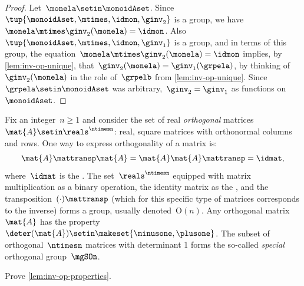 {\begin{proof}
    Let~$\monela \setin \monoidAset$.
    Since~$\tup{\monoidAset, \mtimes, \idmon, \ginv_2 }$ is a group, we have~$\monela \mtimes \ginv_2(\monela) = \idmon$.
    Also~$\tup{\monoidAset, \mtimes, \idmon, \ginv_1}$ is a group, and in terms of this group, the equation~$\monela \mtimes \ginv_2(\monela) = \idmon$ implies, by \cref{lem:inv-op-unique}, that~$\ginv_2(\monela) = \ginv_1(\grpela)$, by thinking of~$\ginv_2(\monela)$ in the role of~$\grpelb$ from \cref{lem:inv-op-unique}.
    Since~$\grpela \setin \monoidAset$ was arbitrary,~$\ginv_2 = \ginv_1$ as functions on~$\monoidAset$.
\end{proof}



\begin{example}

    Fix an integer~$n\geq 1$ and consider the set of real \emph{orthogonal} matrices~$\mat{A}\setin \reals^{\ntimesn}$:
    real, square matrices with orthonormal columns and rows.
    One way to express orthogonality of a matrix is:
    \begin{equation}
        \mat{A}\mattransp \mat{A}=\mat{A}\mat{A}\mattransp = \idmat,
    \end{equation}
    where~$\idmat$ is the .
    The set~$\reals^{\ntimesn}$ equipped with matrix multiplication as a binary operation, the identity matrix as the , and the transposition~$(\cdot)\mattransp$ (which for this specific type of matrices corresponds to the inverse) forms a group, usually denoted~$\text{O}(n)$.
    Any orthogonal matrix~$\mat{A}$ has the property~$\deter(\mat{A})\setin \makeset{{{\minusone}},{{\plusone}}}$.
    The subset of orthogonal~$\ntimesn$ matrices with determinant 1 forms the so-called \emph{special} orthogonal group~$\mgSOn$.
\end{example}



\begin{gradedexercise}
    \label{ex:GroupInverseProperties}
    Prove \cref{lem:inv-op-properties}.
\end{gradedexercise}



}
